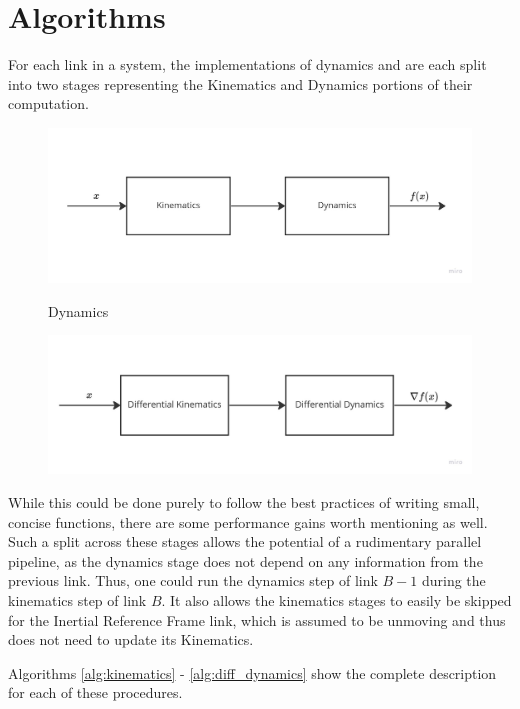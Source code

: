 \section{Algorithms}

\noindent For each link in a system, the implementations of dynamics and \algname{} are each split into two stages representing the Kinematics and Dynamics portions of their computation. 

\begin{figure}[H]
    \centering
    \includegraphics[width=\textwidth]{Figures/Implementation/IsenDynamcs.jpg}
    \caption{Dynamics}
    \label{fig:isendyn}
    \includegraphics[width=\textwidth]{Figures/Implementation/GradDynamics.jpg}
    \caption{\algname{}}
    \label{fig:graddyn}
\end{figure}

\noindent While this could be done purely to follow the best practices of writing small, concise functions, there are some performance gains worth mentioning as well. Such a split across these stages allows the potential of a rudimentary parallel pipeline, as the dynamics stage does not depend on any information from the previous link. Thus, one could run the dynamics step of link $B-1$ during the kinematics step of link $B$. It also allows the kinematics stages to easily be skipped for the Inertial Reference Frame link, which is assumed to be unmoving and thus does not need to update its Kinematics. \newpage

Algorithms \ref{alg:kinematics} - \ref{alg:diff_dynamics} show the complete description for each of these procedures.
 
